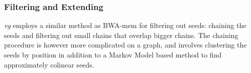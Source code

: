 \subsubsection{Filtering and Extending}
\emph{vg} employs a similar method as BWA-mem for filtering out seeds: chaining the seeds and filtering out small chains that overlap bigger chains.
The chaining procedure is however more complicated on a graph, and involves clustering the seeds by position in addition to a Markov Model based method to find approximately colinear seeds. 





